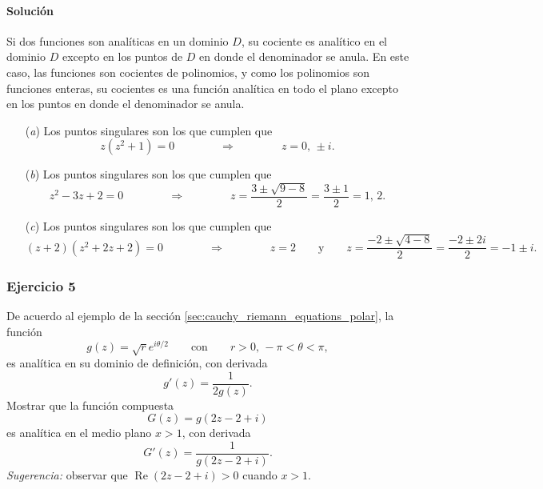 \documentclass[a4paper]{report}
\renewcommand{\Re}{\operatorname{Re}}
\begin{document}
\paragraph{Solución} Si dos funciones son analíticas en un dominio \(D\), su cociente es analítico en el dominio \(D\) excepto en los puntos de \(D\) en donde el denominador se anula. En este caso, las funciones son cocientes de polinomios, y como los polinomios son funciones enteras, su cocientes es una función analítica en todo el plano excepto en los puntos en donde el denominador se anula.
\begin{enumerate}
 \item[(\textit{a})] Los puntos singulares son los que cumplen que 
 \[
  z(z^2+1)=0
  \qquad\qquad\Rightarrow\qquad\qquad
  z=0,\,\pm i.
 \]
 \item[(\textit{b})] Los puntos singulares son los que cumplen que 
 \[
  z^2-3z+2=0
  \qquad\qquad\Rightarrow\qquad\qquad
  z=\frac{3\pm\sqrt{9-8}}{2}=\frac{3\pm1}{2}=1,\,2.
 \]
 \item[(\textit{c})] Los puntos singulares son los que cumplen que 
 \[
  (z+2)(z^2+2z+2)=0
  \qquad\qquad\Rightarrow\qquad\qquad
  z=2\qquad\textrm{y}\qquad
  z=\frac{-2\pm\sqrt{4-8}}{2}=\frac{-2\pm2i}{2}=-1\pm i.
 \]
\end{enumerate}

\subsubsection{Ejercicio 5}

De acuerdo al ejemplo de la sección \ref{sec:cauchy_riemann_equations_polar}, la función
\[
 g(z)=\sqrt{r}e^{i\theta/2}\qquad\textrm{con}\qquad r>0,\,-\pi<\theta<\pi,
\]
es analítica en su dominio de definición, con derivada
\[
 g'(z)=\frac{1}{2g(z)}.
\]
Mostrar que la función compuesta 
\[
 G(z)=g(2z-2+i)
\]
es analítica en el medio plano \(x>1\), con derivada
\[
 G'(z)=\frac{1}{g(2z-2+i)}.
\]
\emph{Sugerencia:} observar que \(\Re(2z-2+i)>0\) cuando \(x>1\).
\end{document}
